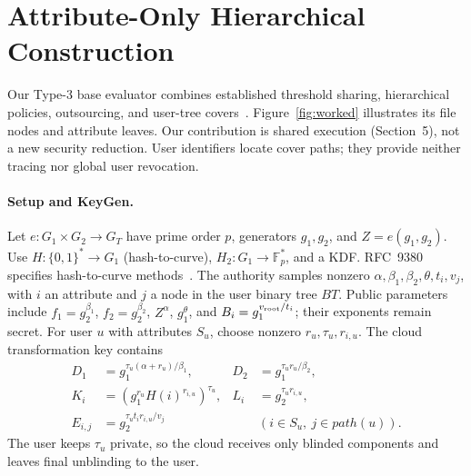 \documentclass[runningheads]{llncs}
\newif\ifmarkrevisions
\newenvironment{revision}{\par\begingroup\ifmarkrevisions\color{RevisionBlue}\fi}{\par\endgroup}
\begin{document}
\section{Attribute-Only Hierarchical Construction}
\begin{revision}
\label{sec:construction}
Our Type-3 base evaluator combines established threshold sharing,
hierarchical policies, outsourcing, and user-tree
covers~\cite{Shamir1979SecretSharing,Wang2016FileHierarchy,Green2011OutsourcedABE,Naor2001Cover}.
Figure~\ref{fig:worked} illustrates its file nodes and attribute leaves.
Our contribution is shared execution (Section~5), not a new security
reduction. User identifiers locate cover paths; they provide neither tracing
nor global user revocation.


\paragraph{Setup and KeyGen.}
Let $e:G_1\times G_2\to G_T$ have prime order $p$, generators $g_1,g_2$,
and $Z=e(g_1,g_2)$. Use $H:\{0,1\}^*\to G_1$ (hash-to-curve),
$H_2:G_1\to\mathbb F_p^*$, and a KDF. RFC~9380 specifies hash-to-curve
methods~\cite{FazHernandez2023HashToCurve}. The authority samples nonzero
$\alpha,\beta_1,\beta_2,\theta,t_i,v_j$, with $i$ an attribute and $j$ a
node in the user binary tree $BT$. Public parameters include
$f_1=g_2^{\beta_1}$, $f_2=g_2^{\beta_2}$, $Z^\alpha$, $g_1^\theta$, and
$B_i=g_1^{v_{\rm root}/t_i}$; their exponents remain secret.
For user $u$ with attributes $S_u$, choose nonzero $r_u,\tau_u,r_{i,u}$.
The cloud transformation key contains
\begin{align}
 D_1&=g_1^{\tau_u(\alpha+r_u)/\beta_1},&
 D_2&=g_1^{\tau_u r_u/\beta_2},\nonumber\\
 K_i&=(g_1^{r_u}H(i)^{r_{i,u}})^{\tau_u},&
 L_i&=g_2^{\tau_u r_{i,u}},\label{eq:keys}\\
 E_{i,j}&=g_2^{\tau_u t_i r_{i,u}/v_j}
 &&(i\in S_u,\ j\in path(u)).\nonumber
\end{align}
The user keeps $\tau_u$ private, so the cloud receives only blinded
components and leaves final unblinding to the user.


\end{revision}
\end{document}
